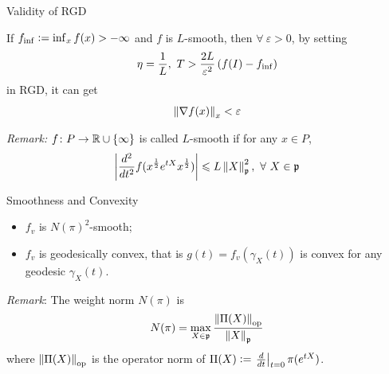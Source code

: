 \documentclass{beamer}
\begin{document}
	\begin{frame}{Validity of RGD}
		\begin{thm}
			If $f_{\inf} \vcentcolon= \inf_x f(x) > -\infty$ and $f$ is $L$-smooth, then $\forall~\varepsilon > 0$, by setting
			\vspace{-0.5em}
			\begin{equation*}
				\eta = \frac{1}{L},~T > \frac{2L}{\varepsilon^2}\bc{f(I)-f_{\inf}}
				\vspace{-0.5em}
			\end{equation*}
			in RGD, it can get
			\vspace{-0.5em}
			\begin{equation*}
				\left\lVert\nabla f(x)\right\lVert_{x} < \varepsilon
			\end{equation*}
		\end{thm}
		\vspace{0.5em}
		\emph{Remark:} $f \colon P \rightarrow \mathbb{R} \cup \{\infty\}$ is called $L$-smooth if for any $x \in P$,
			\vspace{-0.5em}
			\begin{equation*}
				\left\lvert\frac{d^2}{dt^2}f(x^{\frac{1}{2}}e^{tX}x^{\frac{1}{2}})\right\lvert \leqslant L\left\lVert X\right\lVert_{\mathfrak{p}}^2,~\forall~X\in \mathfrak{p}
			\end{equation*}
	\end{frame}

	\begin{frame}{Smoothness and Convexity}	
		\begin{thm}
			\begin{itemize}
				\item $f_v$ is $N(\pi)^2$-smooth;
				\item $f_v$ is geodesically convex, that is $g(t) = f_v(\gamma_X(t))$ is convex for any geodesic $\gamma_X(t)$.
			\end{itemize}
		\end{thm}
		\vspace{0.5em}	
		\emph{Remark}: The weight norm \cite{key8} $N(\pi)$ is
			\vspace{-0.5em}
			\begin{equation*}
				N(\pi) = \max_{X \in \alg{p}} \frac{\norm{\Pi(X)}_{\op}}{\norm{X}_{\alg{p}}}
				\vspace{-0.5em}
			\end{equation*}
			where $\left\lVert\Pi(X)\right\lVert_{\operatorname{op}}$ is the operator norm of $\Pi(X) \vcentcolon= \left.\frac{d}{dt}\right\lvert_{t=0}\pi(e^{tX})$.
	\end{frame}
\end{document}
